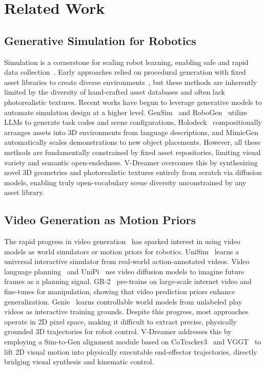 \section{Related Work}

\subsection{Generative Simulation for Robotics}
Simulation is a cornerstone for scaling robot learning, enabling safe and rapid data collection~\cite{todorov2012mujoco, makoviychuk2021isaac}. Early approaches relied on procedural generation with fixed asset libraries to create diverse environments~\cite{deitke2023procthor, szot2021habitat}, but these methods are inherently limited by the diversity of hand-crafted asset databases and often lack photorealistic textures. Recent works have begun to leverage generative models to automate simulation design at a higher level. GenSim~\cite{wang2024gensim} and RoboGen~\cite{wang2023robogen} utilize LLMs to generate task codes and scene configurations, Holodeck~\cite{yang2024holodeck} compositionally arranges assets into 3D environments from language descriptions, and MimicGen~\cite{mandlekar2023mimicgen} automatically scales demonstrations to new object placements. However, all these methods are fundamentally constrained by fixed asset repositories, limiting visual variety and semantic open-endedness. V-Dreamer overcomes this by synthesizing novel 3D geometries and photorealistic textures entirely from scratch via diffusion models, enabling truly open-vocabulary scene diversity unconstrained by any asset library.

\subsection{Video Generation as Motion Priors}
The rapid progress in video generation~\cite{blattmann2023stable, wu2023tune} has sparked interest in using video models as world simulators or motion priors for robotics. UniSim~\cite{yang2023unisim} learns a universal interactive simulator from real-world action-annotated videos. Video language planning~\cite{cohen2024avdc} and UniPi~\cite{du2023learning} use video diffusion models to imagine future frames as a planning signal. GR-2~\cite{gu2024gr2} pre-trains on large-scale internet video and fine-tunes for manipulation, showing that video prediction priors enhance generalization. Genie~\cite{bruce2024genie} learns controllable world models from unlabeled play videos as interactive training grounds. Despite this progress, most approaches operate in 2D pixel space, making it difficult to extract precise, physically grounded 3D trajectories for robot control. V-Dreamer addresses this by employing a Sim-to-Gen alignment module based on CoTracker3~\cite{karaev2023cotracker} and VGGT~\cite{wang2025vggt} to lift 2D visual motion into physically executable end-effector trajectories, directly bridging visual synthesis and kinematic control.


